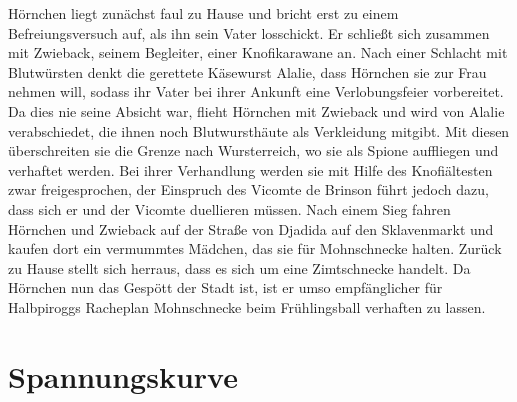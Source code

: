 Hörnchen liegt zunächst faul zu Hause und bricht erst zu einem Befreiungsversuch auf, als ihn sein Vater losschickt. Er schließt sich zusammen mit Zwieback, seinem Begleiter, einer Knofikarawane an. Nach einer Schlacht mit Blutwürsten denkt die gerettete Käsewurst Alalie, dass Hörnchen sie zur Frau nehmen will, sodass ihr Vater bei ihrer Ankunft eine Verlobungsfeier vorbereitet. Da dies nie seine Absicht war, flieht Hörnchen mit Zwieback und wird von Alalie verabschiedet, die ihnen noch Blutwursthäute als Verkleidung mitgibt. Mit diesen überschreiten sie die Grenze nach Wursterreich, wo sie als Spione auffliegen und verhaftet werden. Bei ihrer Verhandlung werden sie mit Hilfe des Knofiältesten zwar freigesprochen, der Einspruch des Vicomte de Brinson führt jedoch dazu, dass sich er und der Vicomte duellieren müssen. Nach einem Sieg fahren Hörnchen und Zwieback auf der Straße von Djadida auf den Sklavenmarkt und kaufen dort ein vermummtes Mädchen, das sie für Mohnschnecke halten. Zurück zu Hause stellt sich herraus, dass es sich um eine Zimtschnecke handelt. Da Hörnchen nun das Gespött der Stadt ist, ist er umso empfänglicher für Halbpiroggs Racheplan Mohnschnecke beim Frühlingsball verhaften zu lassen.


\section{Spannungskurve}


